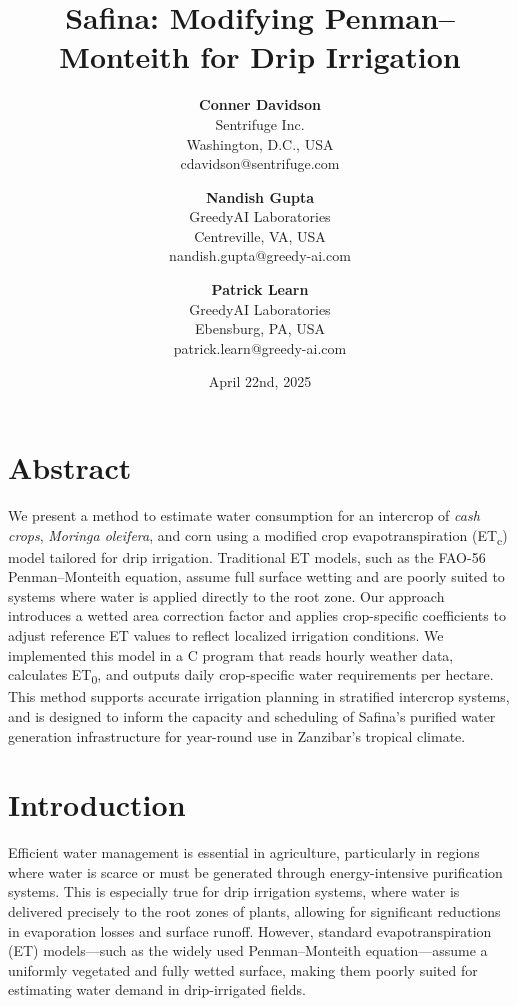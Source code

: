 \documentclass[twocolumn]{article}
\begin{document}
\title{\textbf{Safina: Modifying Penman–Monteith for Drip Irrigation}}
\author{\textbf{Conner Davidson} \\ Sentrifuge Inc. \\ Washington, D.C., USA \\ cdavidson@sentrifuge.com \and \textbf{Nandish Gupta} \\ GreedyAI Laboratories \\ Centreville, VA, USA \\ nandish.gupta@greedy-ai.com \and \textbf{Patrick Learn} \\ GreedyAI Laboratories \\ Ebensburg, PA, USA \\ patrick.learn@greedy-ai.com}
\date{April 22nd, 2025}
\maketitle
\section{Abstract}
We present a method to estimate water consumption for an intercrop of \textit{cash crops}, \textit{Moringa oleifera}, and corn using a modified crop evapotranspiration (ET\textsubscript{c}) model tailored for drip irrigation. Traditional ET models, such as the FAO-56 Penman–Monteith equation, assume full surface wetting and are poorly suited to systems where water is applied directly to the root zone. Our approach introduces a wetted area correction factor and applies crop-specific coefficients to adjust reference ET values to reflect localized irrigation conditions. We implemented this model in a C program that reads hourly weather data, calculates ET\textsubscript{0}, and outputs daily crop-specific water requirements per hectare. This method supports accurate irrigation planning in stratified intercrop systems, and is designed to inform the capacity and scheduling of Safina’s purified water generation infrastructure for year-round use in Zanzibar’s tropical climate.

\section{Introduction}

Efficient water management is essential in agriculture, particularly in regions where water is scarce or must be generated through energy-intensive purification systems. This is especially true for drip irrigation systems, where water is delivered precisely to the root zones of plants, allowing for significant reductions in evaporation losses and surface runoff. However, standard evapotranspiration (ET) models—such as the widely used Penman–Monteith equation—assume a uniformly vegetated and fully wetted surface\cite{allen1998}, making them poorly suited for estimating water demand in drip-irrigated fields.
\end{document}
